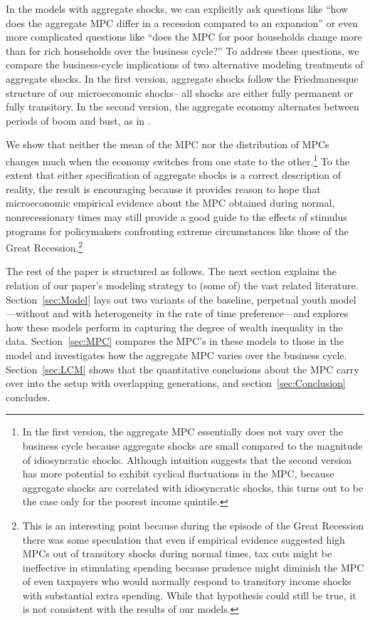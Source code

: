 \documentclass[12pt,titlepage]{econtex}
\begin{document}
In the models with aggregate shocks, we can explicitly ask questions like ``how does the
aggregate MPC differ in a recession compared to an expansion'' or even
more complicated questions like ``does the MPC for poor households
change more than for rich households over the business cycle?''  To address these questions, we compare the business-cycle implications of two alternative modeling
treatments of aggregate shocks.  In the
first version, aggregate shocks follow the Friedmanesque structure
of our microeconomic shocks-- all shocks are either fully permanent or
fully transitory.  In the second version, the aggregate economy
alternates between periods of boom and bust, as in \cite{ksHetero}.

We show that neither the mean of the MPC nor the
distribution of MPCs changes much when the economy switches from one
state to the other.\footnote{In the first version, the aggregate MPC essentially does not vary over the business cycle because aggregate shocks are small compared to the magnitude of idiosyncratic shocks.  Although intuition suggests that the second version has more potential to exhibit cyclical
fluctuations in the MPC, because aggregate shocks are correlated with idiosyncratic shocks, this turns out to be the case only for the poorest income quintile.}  To the extent that either specification of aggregate shocks is a
correct description of reality, the result is encouraging because it
provides reason to hope that microeconomic empirical evidence
about the MPC obtained during normal, nonrecessionary times may still
provide a good guide to the effects of
 stimulus programs for policymakers confronting extreme
circumstances like those of the Great Recession.\footnote{This is an
  interesting point because during the episode of the Great Recession
  there was some speculation that even if empirical evidence suggested
  high MPCs out of transitory shocks during normal times, tax cuts
  might be ineffective in stimulating spending because prudence might
  diminish the MPC of even taxpayers who would normally respond to
  transitory income shocks with substantial extra spending.  While
  that hypothesis could still be true, it is not consistent with the
  results of our models.}

The rest of the paper is structured as follows. The next section
explains the relation of our paper's modeling strategy to (some of)
the vast related literature. Section~\ref{sec:Model} lays out two variants of the
baseline, perpetual youth model---without and with heterogeneity in the rate of time
preference---and explores how these models perform in capturing the
degree of wealth inequality in the data. Section~\ref{sec:MPC}
compares the MPC's in these models to those in the
\citet{ksHetero} model and investigates how the aggregate MPC varies
over the business cycle. Section~\ref{sec:LCM} shows that the quantitative conclusions about the MPC carry over into the setup with overlapping generations, and section~\ref{sec:Conclusion} concludes.
\end{document}
